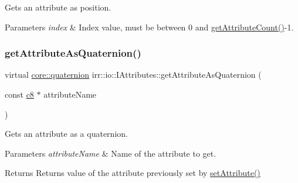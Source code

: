 Gets an attribute as position. 


\begin{DoxyParams}{Parameters}
{\em index} & Index value, must be between 0 and \hyperlink{classirr_1_1io_1_1IAttributes_a796bdd9440ee7ba0b6742a90a82870b6}{get\+Attribute\+Count()}-\/1. \\
\hline
\end{DoxyParams}
\mbox{\label{classirr_1_1io_1_1IAttributes_a59248466d3f3ea2d7930876e577b222d}} 
\subsubsection{\texorpdfstring{get\+Attribute\+As\+Quaternion()}{getAttributeAsQuaternion()}\hspace{0.1cm}{\footnotesize\ttfamily [1/4]}}
{\footnotesize\ttfamily virtual \hyperlink{classirr_1_1core_1_1quaternion}{core\+::quaternion} irr\+::io\+::\+I\+Attributes\+::get\+Attribute\+As\+Quaternion (\begin{DoxyParamCaption}\item[{const \hyperlink{namespaceirr_a9395eaea339bcb546b319e9c96bf7410}{c8} $\ast$}]{attribute\+Name }\end{DoxyParamCaption})\hspace{0.3cm}{\ttfamily [pure virtual]}}



Gets an attribute as a quaternion. 


\begin{DoxyParams}{Parameters}
{\em attribute\+Name} & Name of the attribute to get. \\
\hline
\end{DoxyParams}
\begin{DoxyReturn}{Returns}
Returns value of the attribute previously set by \hyperlink{classirr_1_1io_1_1IAttributes_a03fa31acb481ae23678676cc183f09a6}{set\+Attribute()} 
\end{DoxyReturn}
\mbox{\label{classirr_1_1io_1_1IAttributes_a59248466d3f3ea2d7930876e577b222d}} 
